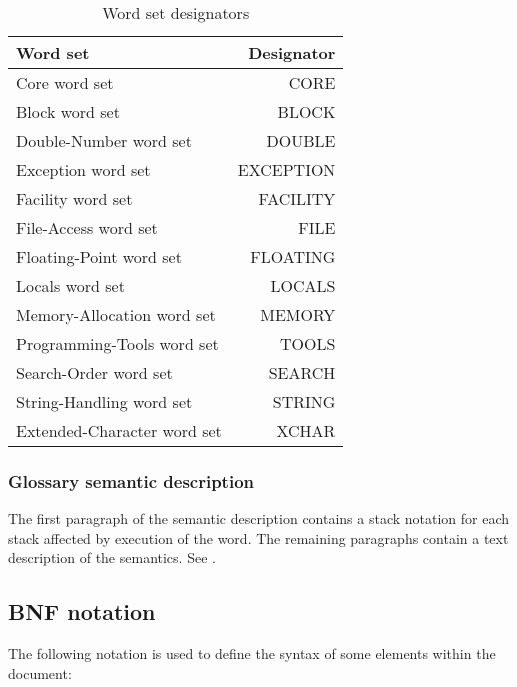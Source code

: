 \begin{table}[ht]
  \begin{center}
	\caption{Word set designators}
	\label{table:wordsets}
	\begin{tabular}{lr}
	\hline\hline
	Word set & Designator \\
	\hline
	Core word set				& CORE		\\
	Block word set				& BLOCK		\\
	Double-Number word set		& DOUBLE	\\
	Exception word set			& EXCEPTION	\\
	Facility word set			& FACILITY	\\
	File-Access word set		& FILE		\\
	Floating-Point word set		& FLOATING	\\
	Locals word set				& LOCALS	\\
	Memory-Allocation word set	& MEMORY	\\
	Programming-Tools word set	& TOOLS		\\
	Search-Order word set		& SEARCH	\\
	String-Handling word set	& STRING	\\
	Extended-Character word set & XCHAR 	\\
	\hline\hline
	\end{tabular}
  \end{center}
\end{table}

\subsubsection{Glossary semantic description}

The first paragraph of the semantic description contains a stack
notation for each stack affected by execution of the word. The
remaining paragraphs contain a text description of the semantics.
See .

\subsection{BNF notation}
\label{notation:BNF}

The following notation is used to define the syntax of some
elements within the document:

